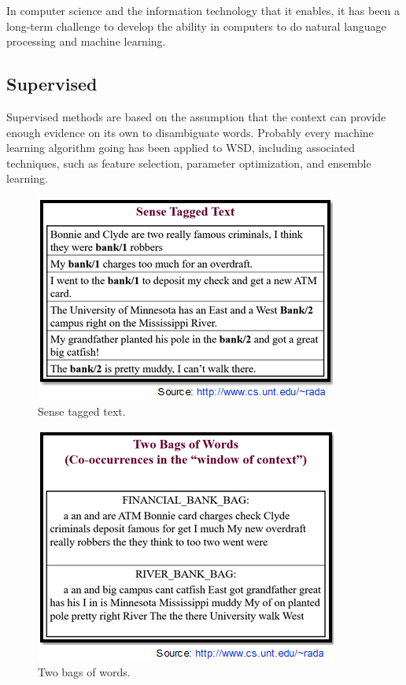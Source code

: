 In computer science and the information technology that it enables, it has been a long-term challenge to develop the ability in computers to do natural language processing and machine learning. 

\subsection*{Supervised}

Supervised methods are based on the assumption that the context can provide enough evidence on its own to disambiguate words. 
Probably every machine learning algorithm going has been applied to WSD, including associated techniques, such as feature selection, parameter optimization, and ensemble learning.

\begin{figure}[tbh]
	\begin{center}
		\includegraphics[width=\columnwidth]{Union_Background_Chart_sup1}
	\end{center}
	\caption{Sense tagged text.}
\end{figure}
\begin{figure}[tbh]
	\begin{center}
		\includegraphics[width=\columnwidth]{Union_Background_Chart_sup2}
	\end{center}
	\caption{Two bags of words.}
\end{figure}
